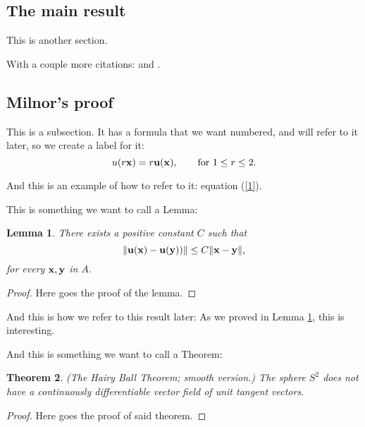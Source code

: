 \documentclass{amsart}
\newtheorem{theorem}{Theorem}[section]
\newtheorem{lemma}[theorem]{Lemma}
\theoremstyle{definition}
\numberwithin{equation}{section}
\def\ve#1{{\bf #1}}
\def\norm#1{\| {\bf #1} \|}
\def\norma#1{\| { #1} \|}
\begin{document}
\begin{sansmath}
\section{The main result}

This is another section.

With a couple more citations:
 \cite{alexandrov} and
 \cite{milnor}.


    \bigskip


\subsection{Milnor's proof}

This is a subsection.
It has a formula that we want numbered, and will refer to it later,
so we create a label for it:
    \begin{equation}
    \label{1}
    u(r \ve x) = r \ve u(\ve x) , \qquad \hbox{for $1 \le r \le 2$.}
    \end{equation}

And this is an example of how to refer to it: equation (\ref{1}).


This is something we want to call a Lemma:

\begin{lemma}
\label{lemma1}
    There exists a positive constant $C$ such that
    $$ \norma{\ve u(\ve x)  - \ve u  (\ve y))} \le C \norm{x-y} , $$
    for every $\ve x, \ve y$ in $A$.
\end{lemma}



\begin{proof}
Here goes the proof of the lemma.
\end{proof}

And this is how we refer to this result later:
As we proved in Lemma \ref{lemma1}, this is interesting.


\medskip

And this is something we want to call a Theorem:


\begin{theorem}
\label{hairy}
{\em(The Hairy Ball Theorem; smooth version.)}
    The sphere $S^2$ does not have a continuously differentiable vector field of unit tangent vectors.
\end{theorem}



\begin{proof}
  Here goes the proof of said theorem.
\end{proof}


\end{sansmath}
\end{document}

